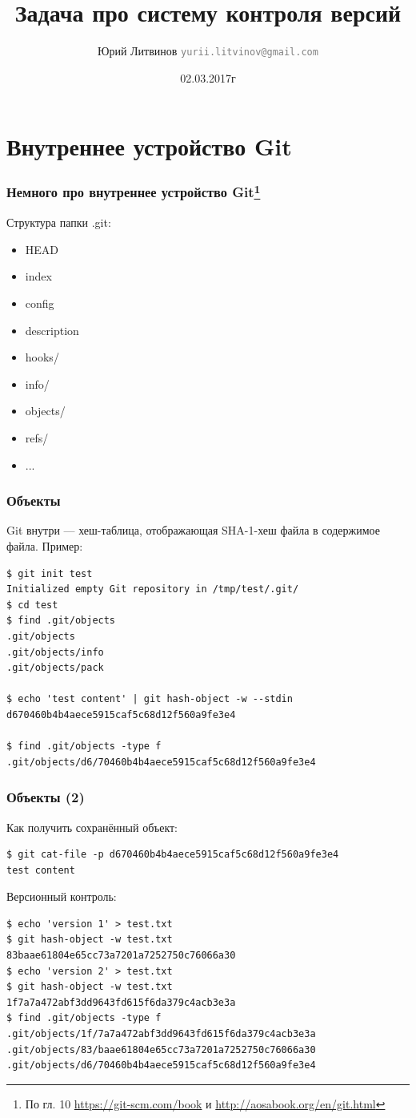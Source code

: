 \documentclass[xetex,mathserif,serif]{beamer}
\title{Задача про систему контроля версий}
\author[Юрий Литвинов]{Юрий Литвинов \newline \textcolor{gray}{\small\texttt{yurii.litvinov@gmail.com}}}
\date{02.03.2017г}
\begin{document}
	
	\frame{\titlepage}
	
	\section{Внутреннее устройство Git}

	\begin{frame}
		\frametitle{Немного про внутреннее устройство Git\footnote{\tiny{По гл. 10 \url{https://git-scm.com/book} и \url{http://aosabook.org/en/git.html}}}}
		Структура папки .git:
		\begin{itemize}
			\item HEAD
			\item index
			\item config
			\item description
			\item hooks/
			\item info/
			\item objects/
			\item refs/
			\item ...
		\end{itemize}
	\end{frame}

	\begin{frame}[fragile]
		\frametitle{Объекты}
		Git внутри --- хеш-таблица, отображающая SHA-1-хеш файла в содержимое файла. Пример:
		\begin{verbatim}
$ git init test
Initialized empty Git repository in /tmp/test/.git/
$ cd test
$ find .git/objects
.git/objects
.git/objects/info
.git/objects/pack

$ echo 'test content' | git hash-object -w --stdin
d670460b4b4aece5915caf5c68d12f560a9fe3e4

$ find .git/objects -type f
.git/objects/d6/70460b4b4aece5915caf5c68d12f560a9fe3e4
		\end{verbatim}
\end{frame}

	\begin{frame}[fragile]
		\frametitle{Объекты (2)}
		Как получить сохранённый объект:
		\begin{verbatim}
$ git cat-file -p d670460b4b4aece5915caf5c68d12f560a9fe3e4
test content
		\end{verbatim}

		Версионный контроль:
		\begin{verbatim}
$ echo 'version 1' > test.txt
$ git hash-object -w test.txt
83baae61804e65cc73a7201a7252750c76066a30
$ echo 'version 2' > test.txt
$ git hash-object -w test.txt
1f7a7a472abf3dd9643fd615f6da379c4acb3e3a
$ find .git/objects -type f
.git/objects/1f/7a7a472abf3dd9643fd615f6da379c4acb3e3a
.git/objects/83/baae61804e65cc73a7201a7252750c76066a30
.git/objects/d6/70460b4b4aece5915caf5c68d12f560a9fe3e4
		\end{verbatim}
\end{frame}
\end{document}
